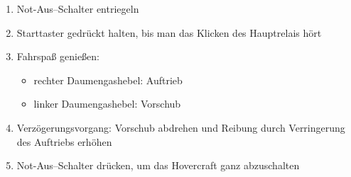 \begin{enumerate}
    \item Not-Aus--Schalter entriegeln
    \item Starttaster gedrückt halten, bis man das Klicken des Hauptrelais hört
    \item Fahrspaß genießen:
    \begin{itemize}
        \item rechter Daumengashebel: Auftrieb
        \item linker Daumengashebel: Vorschub
    \end{itemize}
    \item Verzögerungsvorgang: Vorschub abdrehen und Reibung durch Verringerung des Auftriebs erhöhen
    \item Not-Aus--Schalter drücken, um das Hovercraft ganz abzuschalten
\end{enumerate}